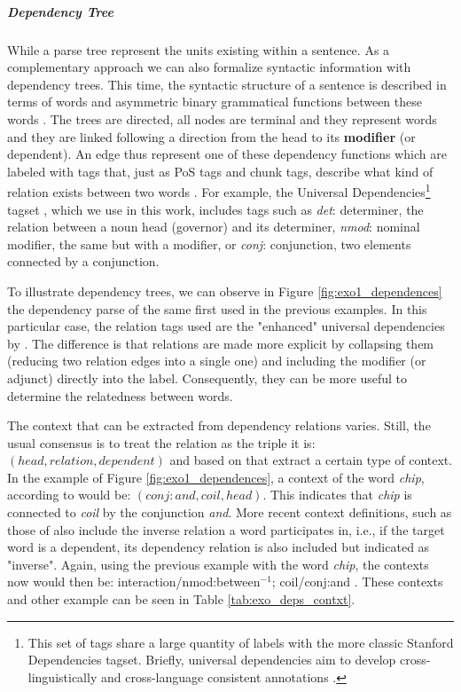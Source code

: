 \subparagraph{Dependency Tree}
While  a parse tree represent the units existing within a sentence. As a complementary approach we can also formalize syntactic information with dependency trees. This time, the syntactic structure of a sentence is described in terms of words and asymmetric binary grammatical functions between these words   \cite{ClarkBook2010}. The trees are directed, all nodes are terminal and they represent words and they are linked following a direction from the head to its \textbf{modifier} (or dependent). An edge thus represent one of these dependency functions which are labeled  with tags that, just as PoS tags and chunk tags, describe what kind of relation exists between two words \cite{bird2006nltk}. For example, the Universal Dependencies\footnote{This set of tags share a large quantity of labels with the more classic Stanford Dependencies \cite{de2006generating,de2008stanford} tagset. Briefly, universal dependencies aim to develop cross-linguistically and cross-language consistent annotations  \cite{nivre2016universal}.} tagset \cite{nivre2016universal,schuster2016enhanced}, which we use in this work, includes tags such as  \textit{det}: determiner, the relation between a noun head (governor) and its determiner, \textit{nmod}: nominal modifier, the same but with a modifier, or \textit{conj}: conjunction, two elements connected by a conjunction.

To illustrate dependency trees, we can observe in Figure \ref{fig:exo1_dependences} the dependency parse of the same first used in the previous examples. In this particular case, the relation tags used are the "enhanced" universal dependencies by \cite{schuster2016enhanced}. The difference is that relations are made more explicit by collapsing them (reducing two relation edges into a single one)  and including the modifier  (or adjunct) directly into the label. Consequently, they can be more useful to determine the relatedness between words.

The context that can be extracted from dependency relations varies. Still, the usual consensus is to treat the relation as the triple it is: $(head, relation, dependent)$ and based on that extract a certain type of context. In the example of Figure \ref{fig:exo1_dependences}, a context of the word  \textit{chip}, according to \cite{Lin1997} would be: $(conj:and,coil,head)$. This indicates that \textit{chip} is connected to \textit{coil} by the conjunction \textit{and}. More recent context definitions, such as those of \cite{baroni2010distributional,LevyG14,Panchenko2017} also include the inverse relation a word participates in, i.e., if the target word is a dependent, its dependency relation is also included but indicated as "inverse".  Again, using the previous example with the  word \textit{chip}, the  contexts now would then be: interaction/nmod:between$^{-1}$; coil/conj:and . These contexts and other example can be seen in Table \ref{tab:exo_deps_contxt}.

